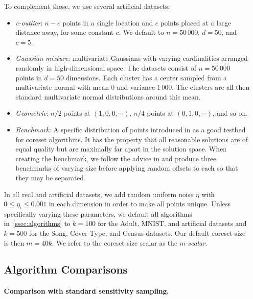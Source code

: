 To complement those, we use several artificial datasets:
\begin{itemize}
    \item \emph{c-outlier}: $n-c$ points in a single location and $c$ points placed at a large distance away, for some constant $c$. We default to $n=50\,000$,
        $d=50$, and $c=5$.
    \item \emph{Gaussian mixture}: multivariate Gaussians with varying cardinalities arranged randomly in high-dimensional space. 
        The datasets consist of $n=50\,000$ points in $d=50$ dimensions. Each cluster has a center sampled from a multivariate normal with mean $0$ and
        variance $1\,000$. The clusters are all then standard multivariate normal distributions around this mean.
    \item \emph{Geometric}: $n/2$ points at $(1, 0, 0, \cdots)$, $n/4$ points at $(0, 1, 0, \cdots)$, and so on.
    \item \emph{Benchmark}: A specific distribution of points introduced in \cite{chrisESA} as a good testbed for coreset algorithms. 
    It has the property that all reasonable solutions are of equal quality but are maximally far apart in the solution space. When creating the benchmark, we
    follow the advice in \cite{chrisESA} and produce three benchmarks of varying size before applying random offsets to each so that they may be separated.
\end{itemize}

In all real and artificial datasets, we add random uniform noise $\eta$ with $0 \leq \eta_i \leq 0.001$ in each dimension in order to make all points unique.
Unless specifically varying these parameters, we default all algorithms in~\ref{ssec:algorithms} to $k=100$ for the Adult, MNIST, and artificial datasets and
$k=500$ for the Song, Cover Type, and Census datasets. Our default coreset size is then $m = 40k$. We refer to the coreset size scalar as the \emph{$m$-scalar}.

\subsection{Algorithm Comparisons}
\label{ssec:alg_qualities}



\paragraph*{Comparison with standard sensitivity sampling.}

